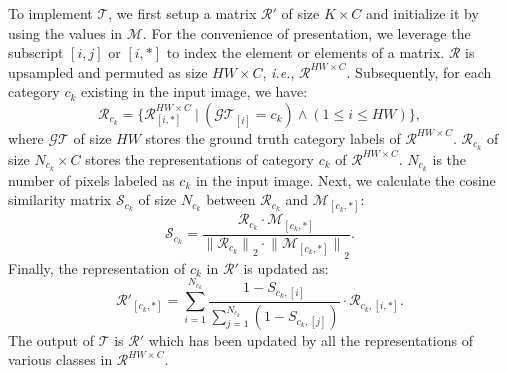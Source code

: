 \documentclass[10pt,twocolumn,letterpaper]{article}
\begin{document}
To implement $\mathscr{T}$, we first setup a matrix $\mathcal{R}'$ of size $K \times C$ and initialize it by using the values in $\mathcal{M}$. 
For the convenience of presentation, we leverage the subscript $[i, j]$ or $[i, *]$ to index the element or elements of a matrix. 
$\mathcal{R}$ is upsampled and permuted as size $HW \times C$, \emph{i.e.}, $\mathcal{R}^{HW \times C}$.
Subsequently, for each category $c_k$ existing in the input image, we have:
\begin{equation} \label{eq2}
   \mathcal{R}_{c_k} = \{\mathcal{R}^{HW \times C}_{[i, *]} ~|~  (\mathcal{GT}_{[i]} = c_k) \land (1 \leq i \leq HW) \},
\end{equation}
where $\mathcal{GT}$ of size $HW$ stores the ground truth category labels of $\mathcal{R}^{HW \times C}$.
$\mathcal{R}_{c_k}$ of size $N_{c_k} \times C$ stores the representations of category $c_k$ of $\mathcal{R}^{HW \times C}$.
$N_{c_k}$ is the number of pixels labeled as $c_k$ in the input image. Next, we calculate the cosine similarity matrix $\mathcal{S}_{c_k}$ of size $N_{c_k}$ between $\mathcal{R}_{c_k}$ and $\mathcal{M}_{[c_k, *]}$:
\begin{equation} \label{eq3}
   \mathcal{S}_{c_k} = \frac{\mathcal{R}_{c_k} \cdot \mathcal{M}_{[c_k, *]}}{{\lVert \mathcal{R}_{c_k} \rVert}_2 \cdot {\lVert \mathcal{M}_{[c_k, *]} \rVert}_2}.
\end{equation}
Finally, the representation of $c_k$ in $\mathcal{R}'$ is updated as:
\begin{equation} \label{eq4}
   \mathcal{R}'_{[c_k, *]} = \sum^{N_{c_k}}_{i=1} \frac{1 - S_{c_k, [i]}}{\sum^{N_{c_k}}_{j=1} (1 - S_{c_k,[j]})} \cdot \mathcal{R}_{c_k, [i, *]}.
\end{equation}
The output of $\mathscr{T}$ is $\mathcal{R}'$ which has been updated by all the representations of various classes in $\mathcal{R}^{HW \times C}$.
\end{document}
